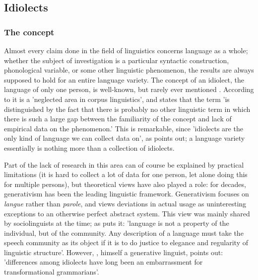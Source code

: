\documentclass[12pt]{article}
\begin{document}
\subsection{Idiolects} \label{idiolects}

\subsubsection{The concept}
Almost every claim done in the field of linguistics concerns language as a whole; whether the subject of investigation is a particular syntactic construction, phonological variable, or some other linguistic phenomenon, the results are always supposed to hold for an entire language variety. The concept of an idiolect, the language of only one person, is well-known, but rarely ever mentioned \cite{mollin09, barlow10, louwerse04}. According to  it is a 'neglected area in corpus linguistics', and  states that the term 'is distinguished by the fact that there is probably no other linguistic term in which there is such a large gap between the familiarity of the concept and lack of empirical data on the phenomenon.' This is remarkable, since 'idiolects are the only kind of language we can collect data on', as  points out; a language variety essentially is nothing more than a collection of idiolects.

Part of the lack of research in this area can of course be explained by practical limitations (it is hard to collect a lot of data for one person, let alone doing this for multiple persons), but theoretical views have also played a role: for decades, generativism has been the leading linguistic framework. Generativism focuses on \emph{langue} rather than \emph{parole}, and views deviations in actual usage as uninteresting exceptions to an otherwise perfect abstract system. This view was mainly shared by sociolinguists at the time; as  puts it: 'language is not a property of the individual, but of the community. Any description of a language must take the speech community as its object if it is to do justice to elegance and regularity of linguistic structure'. However, , himself a generative linguist, points out: 'differences among idiolects have long been an embarrassment for transformational grammarians'.
\end{document}
